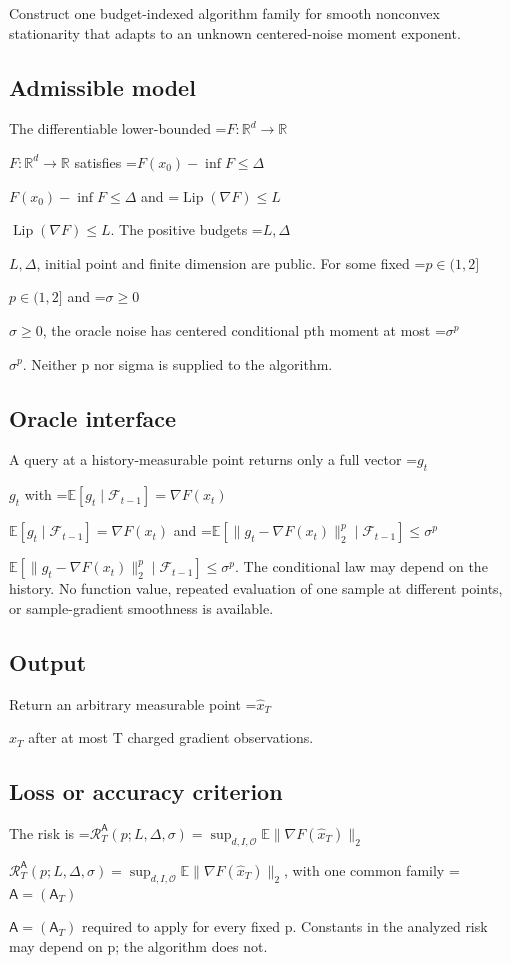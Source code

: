 \documentclass[10pt,a4paper]{article}
\newcommand{\AtlasMath}[1]{\par\begingroup\centering\setbox0=\hbox{$\displaystyle #1$}\ifdim\wd0>1.4\linewidth\typeout{ATLAS WIDE FORMULA: \the\wd0}\fi\ifdim\wd0>\linewidth\resizebox{\linewidth}{!}{\box0}\else\box0\fi\par\endgroup}
\newcommand{\AtlasInlineMath}[1]{\begingroup\setbox0=\hbox{$#1$}\ifdim\wd0>.4\linewidth\endgroup\AtlasMath{#1}\else\endgroup$#1$\fi}
\begin{document}
Construct one budget-indexed algorithm family for smooth nonconvex stationarity that adapts to an unknown centered-noise moment exponent.



\subsection{Admissible model}


The differentiable lower-bounded \AtlasInlineMath{F:\mathbb R^d\to\mathbb R} satisfies \AtlasInlineMath{F(x_0)-\inf F\le\Delta} and \AtlasInlineMath{\operatorname{Lip}(\nabla F)\le L}. The positive budgets \AtlasInlineMath{L,\Delta}, initial point and finite dimension are public. For some fixed \AtlasInlineMath{p\in(1,2]} and \AtlasInlineMath{\sigma\ge0}, the oracle noise has centered conditional pth moment at most \AtlasInlineMath{\sigma^p}. Neither p nor sigma is supplied to the algorithm.



\subsection{Oracle interface}


A query at a history-measurable point returns only a full vector \AtlasInlineMath{g_t} with \AtlasInlineMath{\mathbb E[g_t\mid\mathcal F_{t-1}]=\nabla F(x_t)} and \AtlasInlineMath{\mathbb E[\|g_t-\nabla F(x_t)\|_2^p\mid\mathcal F_{t-1}]\le\sigma^p}. The conditional law may depend on the history. No function value, repeated evaluation of one sample at different points, or sample-gradient smoothness is available.



\subsection{Output}


Return an arbitrary measurable point \AtlasInlineMath{\widehat x_T} after at most T charged gradient observations.



\subsection{Loss or accuracy criterion}


The risk is \AtlasInlineMath{\mathcal R_T^{\mathsf A}(p;L,\Delta,\sigma)=\sup_{d,I,\mathcal O}\mathbb E\|\nabla F(\widehat x_T)\|_2}, with one common family \AtlasInlineMath{\mathsf A=(\mathsf A_T)} required to apply for every fixed p. Constants in the analyzed risk may depend on p; the algorithm does not.
\end{document}
